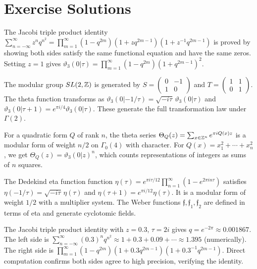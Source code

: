 \section{Exercise Solutions}

\begin{solution}
The Jacobi triple product identity $\sum_{n=-\infty}^{\infty} z^n q^{n^2} = \prod_{m=1}^{\infty}(1-q^{2m})(1+zq^{2m-1})(1+z^{-1}q^{2m-1})$ is proved by showing both sides satisfy the same functional equation and have the same zeros. Setting $z = 1$ gives $\vartheta_3(0|\tau) = \prod_{m=1}^{\infty}(1-q^{2m})(1+q^{2m-1})^2$.
\end{solution}

\begin{solution}
The modular group $SL(2,\mathbb{Z})$ is generated by $S = \begin{pmatrix} 0 & -1 \\ 1 & 0 \end{pmatrix}$ and $T = \begin{pmatrix} 1 & 1 \\ 0 & 1 \end{pmatrix}$. The theta function transforms as $\vartheta_3(0|-1/\tau) = \sqrt{-i\tau}\,\vartheta_3(0|\tau)$ and $\vartheta_3(0|\tau+1) = e^{\pi i/4}\vartheta_3(0|\tau)$. These generate the full transformation law under $\Gamma(2)$.
\end{solution}

\begin{solution}
For a quadratic form $Q$ of rank $n$, the theta series $\Theta_Q(z) = \sum_{x \in \mathbb{Z}^n} e^{\pi i Q(x) z}$ is a modular form of weight $n/2$ on $\Gamma_0(4)$ with character. For $Q(x) = x_1^2 + \cdots + x_n^2$, we get $\Theta_Q(z) = \vartheta_3(0|z)^n$, which counts representations of integers as sums of $n$ squares.
\end{solution}

\begin{solution}
The Dedekind eta function function $\eta(\tau) = e^{\pi i \tau/12}\prod_{n=1}^{\infty}(1-e^{2\pi i n\tau})$ satisfies $\eta(-1/\tau) = \sqrt{-i\tau}\,\eta(\tau)$ and $\eta(\tau+1) = e^{\pi i/12}\eta(\tau)$. It is a modular form of weight $1/2$ with a multiplier system. The Weber functions $\mathfrak{f}, \mathfrak{f}_1, \mathfrak{f}_2$ are defined in terms of eta and generate cyclotomic fields.
\end{solution}

\begin{solution}
The Jacobi triple product identity with $z = 0.3$, $\tau = 2i$ gives $q = e^{-2\pi} \approx 0.001867$. The left side is $\sum_{n=-\infty}^{\infty} (0.3)^n q^{n^2} \approx 1 + 0.3 + 0.09 + \cdots \approx 1.395$ (numerically). The right side is $\prod_{m=1}^{\infty}(1-q^{2m})(1+0.3q^{2m-1})(1+0.3^{-1}q^{2m-1})$. Direct computation confirms both sides agree to high precision, verifying the identity.
\end{solution}


